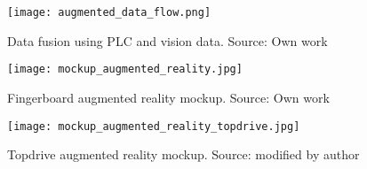 \begin{figure}[ht]
    \centering
    \texttt{[image: augmented\_data\_flow.png]}
    \caption{Data fusion using PLC and vision data. Source: Own work}
    \label{fig:augmented_data_flow}
\end{figure}
\FloatBarrier


\begin{figure}[ht]
    \centering
    \texttt{[image: mockup\_augmented\_reality.jpg]}
    \caption{Fingerboard augmented reality mockup. Source: Own work}
    \label{fig:mockup_augmented_reality}
\end{figure}
\FloatBarrier

\begin{figure}[ht]
    \centering
    \texttt{[image: mockup\_augmented\_reality\_topdrive.jpg]}
    \caption{Topdrive augmented reality mockup. Source: \citet{dc15} modified by author}
    \label{fig:mockup_augmented_reality_topdrive}
\end{figure}
\FloatBarrier